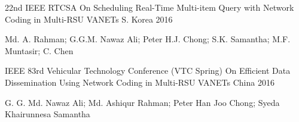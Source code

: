 \begin{cventries}
  \cventry
    {22nd IEEE RTCSA} %
    {On Scheduling Real-Time Multi-item Query with Network Coding in Multi-RSU VANETs} %
    {S. Korea} %
    {2016} %
    {
      \begin{cvitems} %
        \item {Md. A. Rahman; G.G.M. Nawaz Ali; Peter H.J. Chong; S.K. Samantha; M.F. Muntasir; C. Chen}
      \end{cvitems}
    }
    {}

  \cventry
    {IEEE 83rd Vehicular Technology Conference (VTC Spring)} %
    {On Efficient Data Dissemination Using Network Coding in Multi-RSU VANETs} %
    {China} %
    {2016} %
    {
      \begin{cvitems} %
        \item {G. G. Md. Nawaz Ali; Md. Ashiqur Rahman; Peter Han Joo Chong; Syeda Khairunnesa Samantha}
      \end{cvitems}
    }
    {}

\end{cventries}
